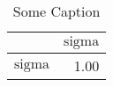 \renewcommand{\pm}{\ensuremath{\oldpm} }
\begin{sidewaystable}[h]
\begin{center}
\begin{tabular}{@{}|l|r|@{}}
\hline
 & $\text{sigma}$\\ \hline \hline
$\text{sigma}$ & 1.00 \\
\hline
\end{tabular}
\caption{Some Caption}
\label{thisTable}
\end{center}
\end{sidewaystable}
\renewcommand{\pm}{\oldpm}
\restoregeometry

